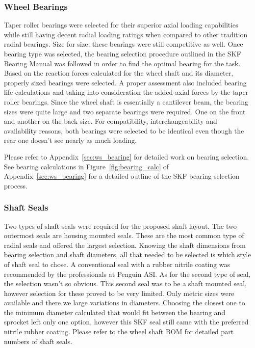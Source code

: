 \subsubsection{Wheel Bearings}
Taper roller bearings were selected for their superior axial loading capabilities while still having decent radial loading ratings when compared to other tradition radial bearings. Size for size, these bearings were still competitive as well. Once bearing type was selected, the bearing selection procedure outlined in the SKF Bearing Manual was followed in order to find the optimal bearing for the task. Based on the reaction forces calculated for the wheel shaft and its diameter, properly sized bearings were selected. A proper assessment also included bearing life calculations and taking into consideration the added axial forces by the taper roller bearings. Since the wheel shaft is essentially a cantilever beam, the bearing sizes were quite large and two separate bearings were required. One on the front and another on the back size. For compatibility, interchangeability and availability reasons, both bearings were selected to be identical even though the rear one doesn't see nearly as much loading.

Please refer to Appendix~\ref{sec:ws_bearing} for detailed work on bearing selection. See bearing calculations in Figure~\ref{fig:bearing_calc} of Appendix~\ref{sec:ws_bearing} for a detailed outline of the SKF bearing selection process.

\subsubsection{Shaft Seals}
Two types of shaft seals were required for the proposed shaft layout. The two outermost seals are housing mounted seals. These are the most common type of radial seals and offered the largest selection. Knowing the shaft dimensions from bearing selection and shaft diameters, all that needed to be selected is which style of shaft seal to chose. A conventional seal with a rubber nitrile coating was recommended by the professionals at Penguin ASI. As for the second type of seal, the selection wasn't so obvious. This second seal was to be a shaft mounted seal, however selection for these proved to be very limited. Only metric sizes were available and there we large variations in diameters. Choosing the closest one to the minimum diameter calculated that would fit between the bearing and sprocket left only one option, however this SKF seal still came with the preferred nitrile rubber coating. Please refer to the wheel shaft BOM for detailed part numbers of shaft seals.

